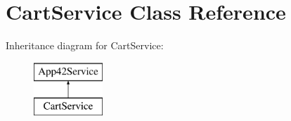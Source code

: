 \hypertarget{class_cart_service}{\section{Cart\+Service Class Reference}
\label{class_cart_service}
}
Inheritance diagram for Cart\+Service\+:\begin{figure}[H]
\begin{center}
\leavevmode
\includegraphics[height=2.000000cm]{class_cart_service}
\end{center}
\end{figure}
